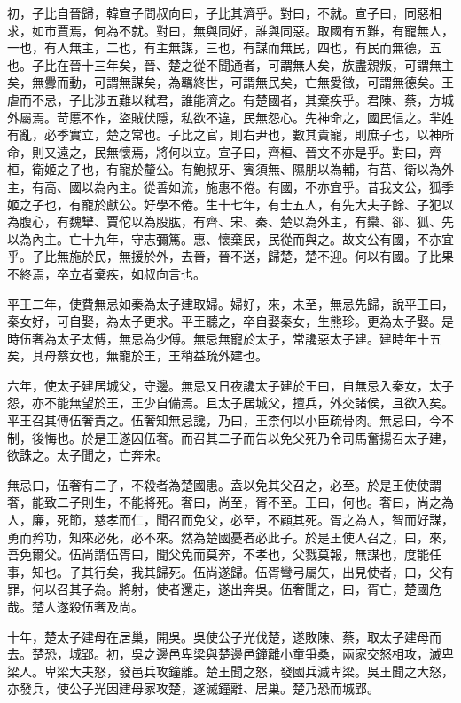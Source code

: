 初，子比自晉歸，韓宣子問叔向曰，子比其濟乎。對曰，不就。宣子曰，同惡相求，如市賈焉，何為不就。對曰，無與同好，誰與同惡。取國有五難，有寵無人，一也，有人無主，二也，有主無謀，三也，有謀而無民，四也，有民而無德，五也。子比在晉十三年矣，晉、楚之從不聞通者，可謂無人矣，族盡親叛，可謂無主矣，無釁而動，可謂無謀矣，為羈終世，可謂無民矣，亡無愛徵，可謂無德矣。王虐而不忌，子比涉五難以弒君，誰能濟之。有楚國者，其棄疾乎。君陳、蔡，方城外屬焉。苛慝不作，盜賊伏隱，私欲不違，民無怨心。先神命之，國民信之。羋姓有亂，必季實立，楚之常也。子比之官，則右尹也，數其貴寵，則庶子也，以神所命，則又遠之，民無懷焉，將何以立。宣子曰，齊桓、晉文不亦是乎。對曰，齊桓，衛姬之子也，有寵於釐公。有鮑叔牙、賓須無、隰朋以為輔，有莒、衛以為外主，有高、國以為內主。從善如流，施惠不倦。有國，不亦宜乎。昔我文公，狐季姬之子也，有寵於獻公。好學不倦。生十七年，有士五人，有先大夫子餘、子犯以為腹心，有魏犫、賈佗以為股肱，有齊、宋、秦、楚以為外主，有欒、郤、狐、先以為內主。亡十九年，守志彌篤。惠、懷棄民，民從而與之。故文公有國，不亦宜乎。子比無施於民，無援於外，去晉，晉不送，歸楚，楚不迎。何以有國。子比果不終焉，卒立者棄疾，如叔向言也。

平王二年，使費無忌如秦為太子建取婦。婦好，來，未至，無忌先歸，說平王曰，秦女好，可自娶，為太子更求。平王聽之，卒自娶秦女，生熊珍。更為太子娶。是時伍奢為太子太傅，無忌為少傅。無忌無寵於太子，常讒惡太子建。建時年十五矣，其母蔡女也，無寵於王，王稍益疏外建也。

六年，使太子建居城父，守邊。無忌又日夜讒太子建於王曰，自無忌入秦女，太子怨，亦不能無望於王，王少自備焉。且太子居城父，擅兵，外交諸侯，且欲入矣。平王召其傅伍奢責之。伍奢知無忌讒，乃曰，王柰何以小臣疏骨肉。無忌曰，今不制，後悔也。於是王遂囚伍奢。而召其二子而告以免父死乃令司馬奮揚召太子建，欲誅之。太子聞之，亡奔宋。

無忌曰，伍奢有二子，不殺者為楚國患。盍以免其父召之，必至。於是王使使謂奢，能致二子則生，不能將死。奢曰，尚至，胥不至。王曰，何也。奢曰，尚之為人，廉，死節，慈孝而仁，聞召而免父，必至，不顧其死。胥之為人，智而好謀，勇而矜功，知來必死，必不來。然為楚國憂者必此子。於是王使人召之，曰，來，吾免爾父。伍尚謂伍胥曰，聞父免而莫奔，不孝也，父戮莫報，無謀也，度能任事，知也。子其行矣，我其歸死。伍尚遂歸。伍胥彎弓屬矢，出見使者，曰，父有罪，何以召其子為。將射，使者還走，遂出奔吳。伍奢聞之，曰，胥亡，楚國危哉。楚人遂殺伍奢及尚。

十年，楚太子建母在居巢，開吳。吳使公子光伐楚，遂敗陳、蔡，取太子建母而去。楚恐，城郢。初，吳之邊邑卑梁與楚邊邑鐘離小童爭桑，兩家交怒相攻，滅卑梁人。卑梁大夫怒，發邑兵攻鐘離。楚王聞之怒，發國兵滅卑梁。吳王聞之大怒，亦發兵，使公子光因建母家攻楚，遂滅鐘離、居巢。楚乃恐而城郢。

